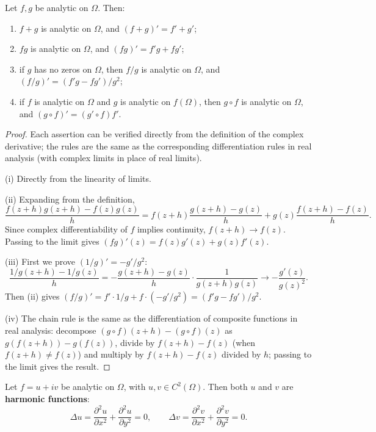 \begin{proposition}\label{prop:ca_analytic_operations}
Let $f, g$ be analytic on $\Omega$. Then:
\begin{enumerate}[label=(\roman*)]
    \item $f + g$ is analytic on $\Omega$, and $(f+g)' = f' + g'$;
    \item $fg$ is analytic on $\Omega$, and $(fg)' = f'g + fg'$;
    \item if $g$ has no zeros on $\Omega$, then $f/g$ is analytic on $\Omega$, and $(f/g)' = (f'g - fg')/g^2$;
    \item if $f$ is analytic on $\Omega$ and $g$ is analytic on $f(\Omega)$, then $g \circ f$ is analytic on $\Omega$, and $(g \circ f)' = (g' \circ f) f'$.
\end{enumerate}
\end{proposition}

\begin{proof}
Each assertion can be verified directly from the definition of the complex derivative; the rules are the same as the corresponding differentiation rules in real analysis (with complex limits in place of real limits).

(i) Directly from the linearity of limits.

(ii) Expanding from the definition,
\[
\frac{f(z+h)g(z+h) - f(z)g(z)}{h} = f(z+h)\frac{g(z+h)-g(z)}{h} + g(z)\frac{f(z+h)-f(z)}{h}.
\]
Since complex differentiability of $f$ implies continuity, $f(z+h) \to f(z)$. Passing to the limit gives $(fg)'(z) = f(z)g'(z) + g(z)f'(z)$.

(iii) First we prove $(1/g)' = -g'/g^2$:
\[
\frac{1/g(z+h) - 1/g(z)}{h} = -\frac{g(z+h)-g(z)}{h} \cdot \frac{1}{g(z+h)g(z)} \to -\frac{g'(z)}{g(z)^2}.
\]
Then (ii) gives $(f/g)' = f' \cdot 1/g + f \cdot (-g'/g^2) = (f'g - fg')/g^2$.

(iv) The chain rule is the same as the differentiation of composite functions in real analysis: decompose $(g \circ f)(z+h) - (g \circ f)(z)$ as $g(f(z+h)) - g(f(z))$, divide by $f(z+h) - f(z)$ (when $f(z+h) \neq f(z)$) and multiply by $f(z+h) - f(z)$ divided by $h$; passing to the limit gives the result.
\end{proof}

\begin{theorem}\label{thm:ca_harmonic_parts}
Let $f = u + iv$ be analytic on $\Omega$, with $u, v \in C^2(\Omega)$. Then both $u$ and $v$ are \textbf{harmonic functions}:
\[
\Delta u = \frac{\partial^2 u}{\partial x^2} + \frac{\partial^2 u}{\partial y^2} = 0, \qquad
\Delta v = \frac{\partial^2 v}{\partial x^2} + \frac{\partial^2 v}{\partial y^2} = 0.
\]
\end{theorem}

